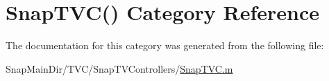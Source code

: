 \hypertarget{category_snap_t_v_c_07_08}{}\section{Snap\+T\+VC() Category Reference}
\label{category_snap_t_v_c_07_08}


The documentation for this category was generated from the following file\+:\begin{DoxyCompactItemize}
\item 
Snap\+Main\+Dir/\+T\+V\+C/\+Snap\+T\+V\+Controllers/\hyperlink{_snap_t_v_c_8m}{Snap\+T\+V\+C.\+m}\end{DoxyCompactItemize}
